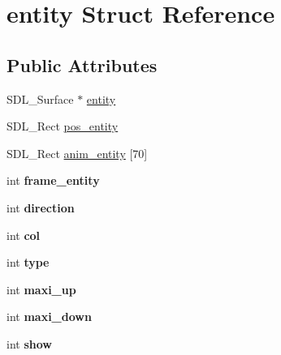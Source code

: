 \hypertarget{structentity}{}\section{entity Struct Reference}
\label{structentity}
\subsection*{Public Attributes}
\begin{DoxyCompactItemize}
\item 
S\+D\+L\+\_\+\+Surface $\ast$ \hyperlink{structentity_a1d532bf2d860422dbcdbf5a3d53bec2a}{entity}
\item 
S\+D\+L\+\_\+\+Rect \hyperlink{structentity_afad5429807d112e50d95031d2a7317ca}{pos\+\_\+entity}
\item 
S\+D\+L\+\_\+\+Rect \hyperlink{structentity_a854a764985b0f1ae5969d3d31534dafc}{anim\+\_\+entity} \mbox{[}70\mbox{]}
\item 
int {\bfseries frame\+\_\+entity}\hypertarget{structentity_a60fd1d07d2b5e6c5e02d3a10d51cec8a}{}\label{structentity_a60fd1d07d2b5e6c5e02d3a10d51cec8a}

\item 
int {\bfseries direction}\hypertarget{structentity_a643c70cbdbf48c0e06d66c2d20ada874}{}\label{structentity_a643c70cbdbf48c0e06d66c2d20ada874}

\item 
int {\bfseries col}\hypertarget{structentity_a5e6a4bc4a8cbd87a5003ac338a832fa7}{}\label{structentity_a5e6a4bc4a8cbd87a5003ac338a832fa7}

\item 
int {\bfseries type}\hypertarget{structentity_afb415e14577c5fc356ae19ad90aa36f3}{}\label{structentity_afb415e14577c5fc356ae19ad90aa36f3}

\item 
int {\bfseries maxi\+\_\+up}\hypertarget{structentity_a18cdb04633bed8b5a32af4fa70a749e8}{}\label{structentity_a18cdb04633bed8b5a32af4fa70a749e8}

\item 
int {\bfseries maxi\+\_\+down}\hypertarget{structentity_a0f5bc5ef872a782b5031825b21d4d029}{}\label{structentity_a0f5bc5ef872a782b5031825b21d4d029}

\item 
int {\bfseries show}\hypertarget{structentity_a3eda708ba5febdc2d10698d31131fb5d}{}\label{structentity_a3eda708ba5febdc2d10698d31131fb5d}

\end{DoxyCompactItemize}


